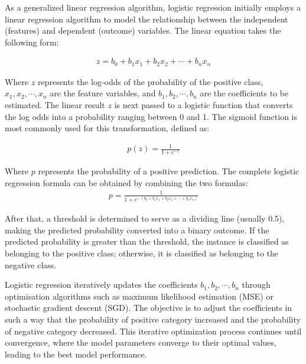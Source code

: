 \documentclass[ %
                    author={Louis Wang},
                supervisor={Dr. Qiang Liu},
                    degree={MSc},
                     title={Identification of Suicide Ideation in Texts},
                      type={},
                      year={2024}]{dissertation}
\begin{document}
As a generalized linear regression algorithm, logistic regression initially employs a linear regression algorithm to model the relationship between the independent (features) and dependent (outcome) variables. The linear equation takes the following form:

\begin{eqnarray}
      z=b_0+b_1x_1+b_2x_2+\cdots+b_nx_n
      \label{Linear Regression}
\end{eqnarray}

Where $z$ represents the log-odds of the probability of the positive class, $x_1,x_2,\cdots,x_n$ are the feature variables, and $b_1,b_2,\cdots,b_n$ are the coefficients to be estimated. The linear result $z$ is next passed to a logistic function that converts the log odds into a probability ranging between 0 and 1. The sigmoid function is most commonly used for this transformation, defined as:

\begin{eqnarray}
      p(z)=\frac{1}{1 + e^{-z}}
      \label{Sigmoid Function}
\end{eqnarray}

Where $p$ represents the probability of a positive prediction. The complete logistic regression formula can be obtained by combining the two formulas:
\begin{eqnarray}
      p=\frac{1}{1 + e^{-(b_0+b_1x_1+b_2x_2+\cdots+b_nx_n)}}
      \label{Logistic Regression}
\end{eqnarray}

After that, a threshold is determined to serve as a dividing line (usually 0.5), making the predicted probability converted into a binary outcome. If the predicted probability is greater than the threshold, the instance is classified as belonging to the positive class; otherwise, it is classified as belonging to the negative class.

Logistic regression iteratively updates the coefficients $b_1,b_2,\cdots,b_n$ through optimisation algorithms such as maximum likelihood estimation (MSE) or stochastic gradient descent (SGD). The objective is to adjust the coefficients in such a way that the probability of positive category increased and the probability of negative category decreased. This iterative optimization process continues until convergence, where the model parameters converge to their optimal values, leading to the best model performance.
\end{document}
